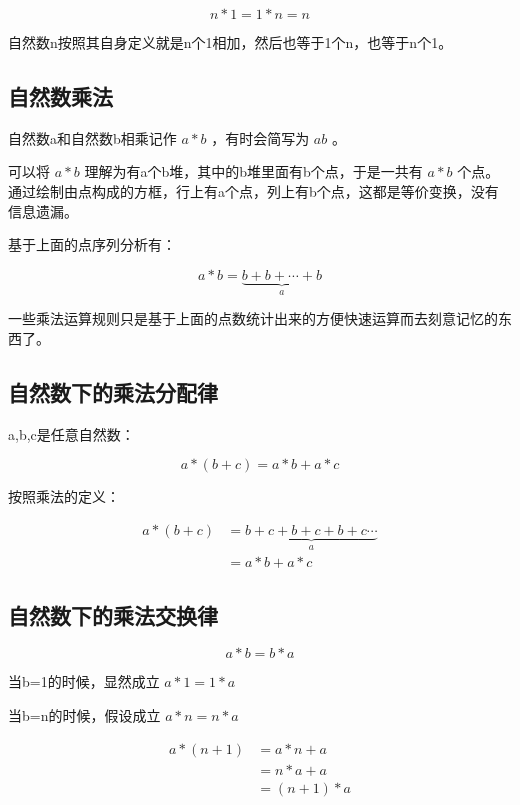\documentclass[12pt,oneside]{book}
\begin{document}
\[
n*1 = 1*n =n
\]

自然数n按照其自身定义就是n个1相加，然后也等于1个n，也等于n个1。

\subsection{自然数乘法}
自然数a和自然数b相乘记作 $a*b$ ，有时会简写为 $ab$ 。

可以将 $a*b$ 理解为有a个b堆，其中的b堆里面有b个点，于是一共有 $a*b$ 个点。\cite{什么是数学}通过绘制由点构成的方框，行上有a个点，列上有b个点，这都是等价变换，没有信息遗漏。

基于上面的点序列分析有：

\begin{equation}
a * b = \underbrace{ b+b+\cdots+b }_{a}
\end{equation}

一些乘法运算规则只是基于上面的点数统计出来的方便快速运算而去刻意记忆的东西了。


\subsection{自然数下的乘法分配律}
a,b,c是任意自然数：

\begin{equation}
a*(b + c) = a*b + a*c
\end{equation}

按照乘法的定义：

\begin{align*}
a*(b+c) &= \underbrace{b+c + b+ c + b +c \cdots}_a\\
&=a*b + a*c
\end{align*}



\subsection{自然数下的乘法交换律}
\begin{equation}
a * b = b * a
\end{equation}

当b=1的时候，显然成立 $a*1 = 1*a$

当b=n的时候，假设成立 $a*n=n*a$

\begin{align*}
a*(n+1) &= a*n +a \\
&=n*a +a\\
&=(n+1)*a
\end{align*}
\end{document}
